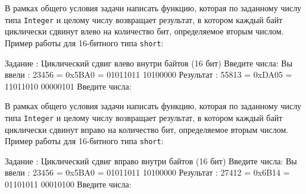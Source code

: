 
\begin{zztask}
В рамках общего условия задачи написать функцию, которая по заданному числу
типа \texttt{Integer} и целому числу возвращает результат, в котором каждый байт
циклически сдвинут влево на количество бит, определяемое вторым числом.
Пример работы для 16-битного типа \texttt{short}:
\begin{zzoutput}
  Задание \thezztask: Циклический сдвиг влево внутри байтов (16 бит)
  Введите числа: 
  Вы ввели  : 23456 = 0x5BA0 = 01011011 10100000
  Результат : 55813 = 0xDA05 = 11011010 00000101
  Введите числа: \zzuser{ }
\end{zzoutput}
\end{zztask}


\begin{zztask}
В рамках общего условия задачи написать функцию, которая по заданному числу
типа \texttt{Integer} и целому числу возвращает результат, в котором каждый байт
циклически сдвинут вправо на количество бит, определяемое вторым числом.
Пример работы для 16-битного типа \texttt{short}:
\begin{zzoutput}
  Задание \thezztask: Циклический сдвиг вправо внутри байтов (16 бит)
  Введите числа: 
  Вы ввели  : 23456 = 0x5BA0 = 01011011 10100000
  Результат : 27412 = 0x6B14 = 01101011 00010100
  Введите числа: \zzuser{ }
\end{zzoutput}
\end{zztask}


